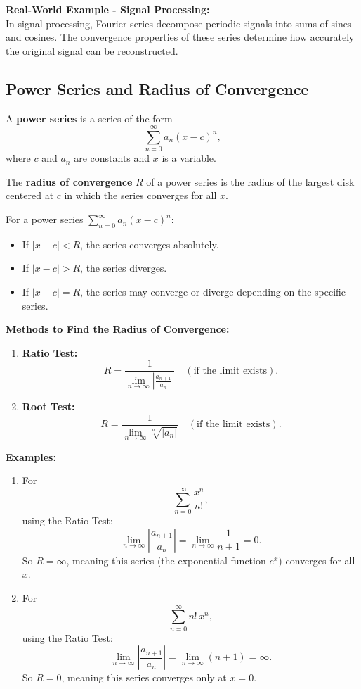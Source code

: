 \documentclass{article}
\begin{document}
\textbf{Real-World Example - Signal Processing:} \\
In signal processing, Fourier series decompose periodic signals into sums of sines and cosines. The convergence properties of these series determine how accurately the original signal can be reconstructed.

\subsection{Power Series and Radius of Convergence} \label{power-series}

A \textbf{power series} is a series of the form 
\[
\sum_{n=0}^{\infty} a_n (x-c)^n,
\]
where $c$ and $a_n$ are constants and $x$ is a variable.

The \textbf{radius of convergence} $R$ of a power series is the radius of the largest disk centered at $c$ in which the series converges for all $x$.

For a power series $\sum_{n=0}^{\infty} a_n (x-c)^n$:
\begin{itemize}
    \item If $|x-c| < R$, the series converges absolutely.
    \item If $|x-c| > R$, the series diverges.
    \item If $|x-c| = R$, the series may converge or diverge depending on the specific series.
\end{itemize}

\textbf{Methods to Find the Radius of Convergence:}
\begin{enumerate}[label=\textbf{\arabic*.}]
    \item \textbf{Ratio Test:} 
    \[
    R = \frac{1}{\lim_{n \to \infty} \left|\frac{a_{n+1}}{a_n}\right|} \quad (\text{if the limit exists}).
    \]
    \item \textbf{Root Test:} 
    \[
    R = \frac{1}{\lim_{n \to \infty} \sqrt[n]{|a_n|}} \quad (\text{if the limit exists}).
    \]
\end{enumerate}

\textbf{Examples:}
\begin{enumerate}[label=\textbf{\arabic*.}]
    \item For 
    \[
    \sum_{n=0}^{\infty} \frac{x^n}{n!},
    \]
    using the Ratio Test: 
    \[
    \lim_{n \to \infty} \left|\frac{a_{n+1}}{a_n}\right| = \lim_{n \to \infty} \frac{1}{n+1} = 0.
    \]
    So $R = \infty$, meaning this series (the exponential function $e^x$) converges for all $x$.
    
    \item For 
    \[
    \sum_{n=0}^{\infty} n! \, x^n,
    \]
    using the Ratio Test:
    \[
    \lim_{n \to \infty} \left|\frac{a_{n+1}}{a_n}\right| = \lim_{n \to \infty} (n+1) = \infty.
    \]
    So $R = 0$, meaning this series converges only at $x = 0$.
\end{enumerate}
\end{document}
